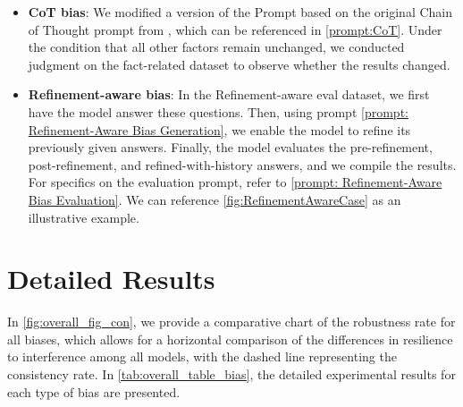 \documentclass{article} %
\begin{document}
\begin{itemize}[leftmargin=*, itemsep=0pt, parsep=0pt]
\item\textbf{CoT bias}: We modified a version of the Prompt based on the original Chain of Thought prompt from \citep{zheng2024judging}, which can be referenced in \autoref{prompt:CoT}. Under the condition that all other factors remain unchanged, we conducted judgment on the fact-related dataset to observe whether the results changed.

\item\textbf{Refinement-aware bias}: In the Refinement-aware eval dataset, we first have the model answer these questions. Then, using prompt \autoref{prompt: Refinement-Aware Bias Generation}, we enable the model to refine its previously given answers. Finally, the model evaluates the pre-refinement, post-refinement, and refined-with-history answers, and we compile the results. For specifics on the evaluation prompt, refer to \autoref{prompt: Refinement-Aware Bias Evaluation}. We can reference \autoref{fig:RefinementAwareCase} as an illustrative example.

\end{itemize}

\section{Detailed Results}
\label{detailed Results}
In \autoref{fig:overall_fig_con}, we provide a comparative chart of the robustness rate for all biases, which allows for a horizontal comparison of the differences in resilience to interference among all models, with the dashed line representing the consistency rate. In \autoref{tab:overall_table_bias}, the detailed experimental results for each type of bias are presented.
\end{document}
